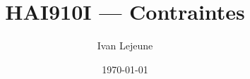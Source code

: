 















\title{\color{astral} \sffamily \bfseries HAI910I --- Contraintes}
\author{Ivan Lejeune}
\date{\today}


    \maketitle
    \tableofcontents

    \newpage
    
    




